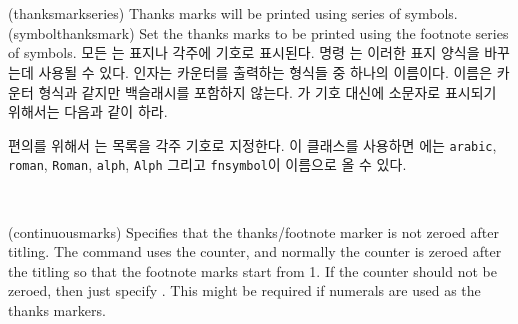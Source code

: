\begin{syntax}
\cmd{\thanksmarkseries} \\
\cmd{\symbolthanksmark} \\
\end{syntax}
\glossary(thanksmarkseries)%
  {}%
  {Thanks marks will be printed using  series of symbols.}
\glossary(symbolthanksmark)%
  {}
  {Set the thanks marks to be printed using the footnote series of symbols.}
모든 \cmd{\thanks}는 표지나 각주에 기호로 표시된다.
명령 \cmd{\thanksmarkseries}는 이러한 표지 양식을 바꾸는데 사용될 수 있다.
 인자는 카운터를 출력하는 형식들 중 하나의 이름이다.
이름은 카운터 형식과 같지만 백슬래시를 포함하지 않는다.
\cmd{\thanks}가 기호 대신에 소문자로 표시되기 위해서는 다음과 같이 하라.
\begin{lcode}
\end{lcode}
편의를 위해서 \cmd{\symbolthanksmark}는 목록을 각주 기호로
지정한다.
이 클래스를 사용하면 에는 \texttt{arabic}, \texttt{roman},
\texttt{Roman}, \texttt{alph}, \texttt{Alph} 그리고 \texttt{fnsymbol}이
이름으로 올 수 있다.

\begin{syntax}
\cmd{\continuousmarks} \\
\end{syntax}
\glossary(continuousmarks)%
  {}%
  {Specifies that the thanks/footnote marker is not zeroed after titling.}
The \cmd{\thanks} command uses the  counter, 
and normally the counter
is zeroed after the titling so that the footnote marks start from 1.
If the counter should not be zeroed, then just specify 
\cmd{\continuousmarks}.
This might be required if numerals are used as the thanks markers.

